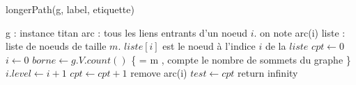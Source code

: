 \documentclass[onecolumn, 12pt]{article}
\begin{document}
\begin{algorithm}
\caption {longerPath(g, label, etiquette)}
\begin{algorithmic}
\REQUIRE g : instance titan
\REQUIRE arc : tous les liens entrants d'un noeud $i$. on note arc(i)
\REQUIRE liste : liste de noeuds de taille $m$. $liste[i]$ est le noeud \`a l'indice $i$ de la $liste$  
%
\STATE $ cpt \leftarrow 0$
\STATE $i \leftarrow 0 $
\STATE $borne \leftarrow g.V.count() $ \{ = m , compte le nombre de sommets du graphe \}
			\STATE $ i.level \leftarrow i+1$
			\STATE $ cpt \leftarrow cpt+1 $
		\ENDIF
				\STATE remove arc(i)
			\ENDIF
	\ENDFOR
		\STATE $test \leftarrow cpt$
	\ELSE 
		\STATE return infinity
	\ENDIF
\ENDWHILE
\end {algorithmic}
\end{algorithm}
 

 
\end{document}
